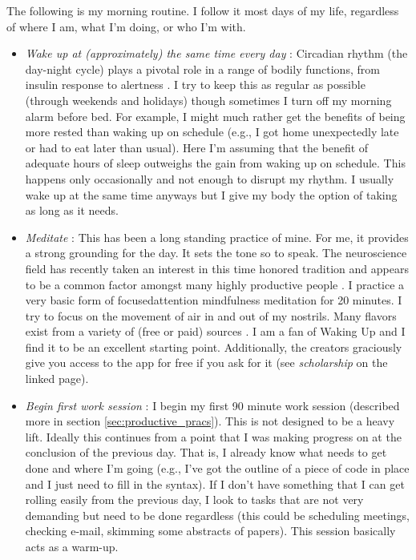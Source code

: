 \documentclass[10pt,twocolumn]{extarticle}
\begin{document}
The following is my morning routine. I follow it most days of my life, regardless of where I am, what I'm doing, or who I'm with.
\begin{itemize}
    \item \textit{Wake up at (approximately) the same time every day} : Circadian rhythm (the day-night cycle) plays a pivotal role in a range of bodily functions, from insulin response \cite{boden1996evidence} to alertness \cite{dijk1992circadian}. I try to keep this as regular as possible (through weekends and holidays) though sometimes I turn off my morning alarm before bed. For example, I might much rather get the benefits of being more rested than waking up on schedule (e.g., I got home unexpectedly late or had to eat later than usual). Here I'm assuming that the benefit of adequate hours of sleep outweighs the gain from waking up on schedule. This happens only occasionally and not enough to disrupt my rhythm. I usually wake up at the same time anyways but I give my body the option of taking as long as it needs.
    \item \textit{Meditate} : This has been a long standing practice of mine. For me, it provides a strong grounding for the day. It sets the tone so to speak. The neuroscience field has recently taken an interest in this time honored tradition \cite{tang2015neuroscience} and appears to be a common factor amongst many highly productive people \cite{ferriss2018}. I practice a very basic form of focused\-attention mindfulness meditation \cite{analayo2019meditation} for 20 minutes. I try to focus on the movement of air in and out of my nostrils. Many flavors exist from a variety of  (free or paid) sources \cite{tenpercenthappier,calm,headspace}. I am a fan of Waking Up\cite{wakingup} and I find it to be an excellent starting point. Additionally, the creators graciously give you access to the app for free if you ask for it (see \textit{scholarship} on the linked page).
    \item \textit{Begin first work session} : I begin my first 90 minute work session (described more in section \ref{sec:productive_pracs}). This is not designed to be a heavy lift. Ideally this continues from a point that I was making progress on at the conclusion of the previous day. That is, I already know what needs to get done and where I'm going (e.g., I've got the outline of a piece of code in place and I just need to fill in the syntax). If I don't have something that I can get rolling easily from the previous day, I look to tasks that are not very demanding but need to be done regardless (this could be scheduling meetings, checking e-mail, skimming some abstracts of papers). This session basically acts as a warm-up. 

\end{itemize}
\end{document}

